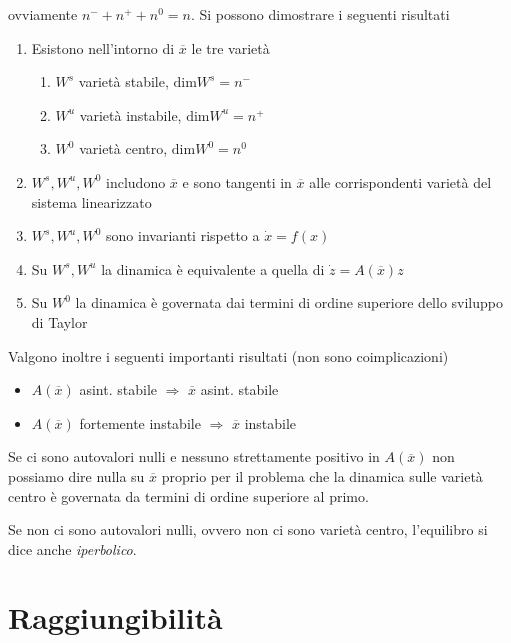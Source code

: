 \documentclass[10pt,a4paper]{book}
\begin{document}
ovviamente $n^{-} +n^{+} +n^{0} =n$. Si possono dimostrare i seguenti risultati
\begin{enumerate}
\item Esistono nell'intorno di $\overline{x}$ le tre varietà
\begin{enumerate}
\item $W^{s}$ varietà stabile, $\mathrm{dim} W^{s} =n^{-}$
\item $W^{u}$ varietà instabile, $\mathrm{dim} W^{u} =n^{+}$
\item $W^{0}$ varietà centro, $\mathrm{dim} W^{0} =n^{0}$
\end{enumerate}
\item $W^{s} ,W^{u} ,W^{0}$ includono $\overline{x}$ e sono tangenti in $\overline{x}$ alle corrispondenti varietà del sistema linearizzato
\item $W^{s} ,W^{u} ,W^{0}$ sono invarianti rispetto a $\dot{x} =f( x)$
\item Su $W^{s} ,W^{u}$ la dinamica è equivalente a quella di $\dot{z} =A(\overline{x}) z$
\item Su $W^{0}$ la dinamica è governata dai termini di ordine superiore dello sviluppo di Taylor
\end{enumerate}

Valgono inoltre i seguenti importanti risultati (non sono coimplicazioni)
\begin{itemize}
\item $A(\overline{x})$ asint. stabile $\Rightarrow $ $\overline{x}$ asint. stabile
\item $A(\overline{x})$ fortemente instabile $\Rightarrow $ $\overline{x}$ instabile
\end{itemize}

Se ci sono autovalori nulli e nessuno strettamente positivo in $A(\overline{x})$ non possiamo dire nulla su $\overline{x}$ proprio per il problema che la dinamica sulle varietà centro è governata da termini di ordine superiore al primo.

Se non ci sono autovalori nulli, ovvero non ci sono varietà centro, l'equilibro si dice anche \textit{iperbolico}.
\chapter{Raggiungibilità}
\end{document}
